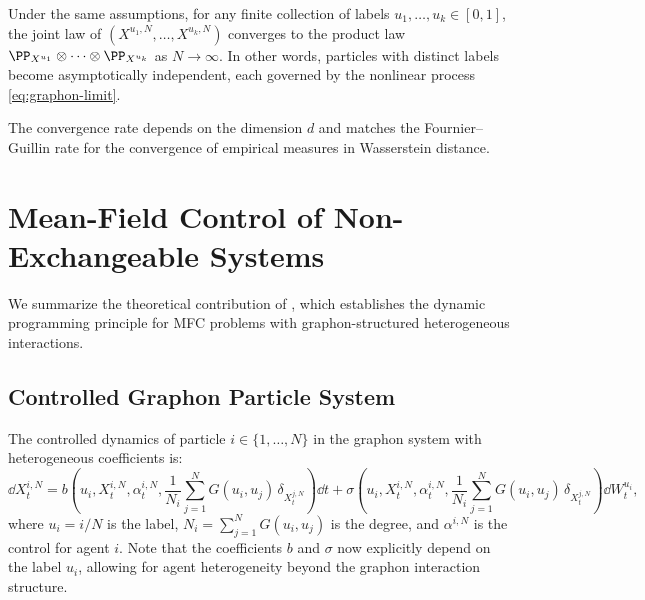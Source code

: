 \documentclass[11pt]{article}
\begin{document}
\begin{theorem}\label{thm:poc}
  Under the same assumptions, for any finite collection of labels $u_1, \ldots, u_k \in [0,1]$, the joint law of $(X^{u_1,N}, \ldots, X^{u_k,N})$ converges to the product law $\PP_{X^{u_1}} \otimes \cdots \otimes \PP_{X^{u_k}}$ as $N \to \infty$. In other words, particles with distinct labels become asymptotically independent, each governed by the nonlinear process \eqref{eq:graphon-limit}.
\end{theorem}

The convergence rate depends on the dimension $d$ and matches the Fournier--Guillin rate \citep{fournier2015rate} for the convergence of empirical measures in Wasserstein distance.


\section{Mean-Field Control of Non-Exchangeable Systems}\label{sec:appendix-nonexch}

We summarize the theoretical contribution of \citet{decrescenzo2025mfc}, which establishes the dynamic programming principle for MFC problems with graphon-structured heterogeneous interactions.

\subsection{Controlled Graphon Particle System}

The controlled dynamics of particle $i \in \{1, \ldots, N\}$ in the graphon system with heterogeneous coefficients is:
\begin{equation}\label{eq:nonexch-particle}
  \dd X_t^{i,N} = b\!\left(u_i, X_t^{i,N}, \alpha_t^{i,N}, \frac{1}{N_i}\sum_{j=1}^N G(u_i, u_j)\,\delta_{X_t^{j,N}}\right)\dd t + \sigma\!\left(u_i, X_t^{i,N}, \alpha_t^{i,N}, \frac{1}{N_i}\sum_{j=1}^N G(u_i, u_j)\,\delta_{X_t^{j,N}}\right)\dd W_t^{u_i},
\end{equation}
where $u_i = i/N$ is the label, $N_i = \sum_{j=1}^N G(u_i, u_j)$ is the degree, and $\alpha^{i,N}$ is the control for agent $i$. Note that the coefficients $b$ and $\sigma$ now explicitly depend on the label $u_i$, allowing for agent heterogeneity beyond the graphon interaction structure.
\end{document}
